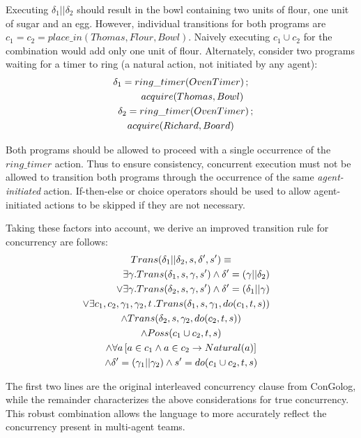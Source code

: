 \documentclass[letterpaper]{article}
\begin{document}
Executing $\delta_{1}||\delta_{2}$ should result in the bowl containing
two units of flour, one unit of sugar and an egg. However, individual
transitions for both programs are $c_{1}=c_{2}=place\_ in(Thomas,Flour,Bowl)$.
Naively executing $c_1 \cup c_2$ for the combination would add only one unit
of flour. Alternately, consider two programs
waiting for a timer to ring (a natural action, not initiated by any agent):
\begin{multline}
\delta_{1}=ring\_ timer(OvenTimer)\,;\\
   \shoveright{acquire(Thomas,Bowl)}\\
\shoveleft{\delta_{2}=ring\_ timer(OvenTimer)\,;}\\
    acquire(Richard,Board)
\end{multline}

Both programs should be allowed to proceed with a single occurrence
of the $ring\_ timer$ action. Thus to ensure consistency, 
concurrent execution must not be allowed
to transition both programs through the occurrence of the same
\emph{agent-initiated} action.  If-then-else or
choice operators should be used to allow agent-initiated actions to be
skipped if they are not necessary.

Taking these factors into account, we derive an improved transition
rule for concurrency are follows:
\begin{multline}
\label{eqn:trans_conc_new}
Trans(\delta_{1}||\delta_{2},s,\delta',s')\equiv\\
\shoveright{\exists\gamma. Trans(\delta_{1},s,\gamma,s')\wedge \delta'=(\gamma||\delta_2)}\\
\shoveright{\vee\exists\gamma. Trans(\delta_{2},s,\gamma,s')\wedge \delta'=(\delta_1 || \gamma)}\\
\shoveright{\vee\exists c_{1},c_{2},\gamma_{1},\gamma_{2},t\,.Trans(\delta_{1},s,\gamma_{1},do(c_{1},t,s))}\\
\wedge Trans(\delta_{2},s,\gamma_{2},do(c_{2},t,s))\\
\wedge Poss(c_{1}\cup c_{2},t,s)\\
\wedge\forall a\left[a\in c_{1}\wedge a\in c_{2}\rightarrow Natural(a)\right]\\
\wedge\delta'=(\gamma_{1}||\gamma_{2})\wedge s'=do(c_{1}\cup c_{2},t,s)
\end{multline}

The first two lines are the original interleaved concurrency clause from
ConGolog, while the remainder
characterizes the above considerations for true concurrency.
This robust combination allows
the language to more accurately reflect the concurrency present in
multi-agent teams.
\end{document}
